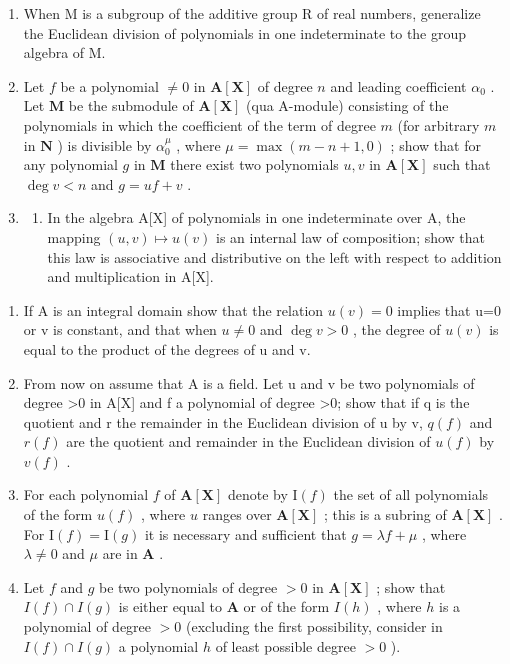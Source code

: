 \BourbakiExerciseGroup

\begin{enumerate}
\def\labelenumi{\arabic{enumi})}
\item
  When M is a subgroup of the additive group R of real numbers, generalize the Euclidean division of polynomials in one indeterminate to the group algebra of M.
\item
  Let \(f\) be a polynomial \(\neq 0\) in \(\mathbf{A}[\mathbf{X}]\) of degree \(n\) and leading coefficient \(\alpha_0\) . Let \(\mathbf{M}\) be the submodule of \(\mathbf{A}[\mathbf{X}]\) (qua A-module) consisting of the polynomials in which the coefficient of the term of degree \(m\) (for arbitrary \(m\) in \(\mathbf{N}\) ) is divisible by \(\alpha_0^\mu\) , where \(\mu = \max(m - n + 1, 0)\) ; show that for any polynomial \(g\) in \(\mathbf{M}\) there exist two polynomials \(u, v\) in \(\mathbf{A}[\mathbf{X}]\) such that \(\deg v < n\) and \(g = uf + v\) .
\item
  \begin{enumerate}
  \def\labelenumii{\alph{enumii})}
  \tightlist
  \item
    In the algebra A{[}X{]} of polynomials in one indeterminate over A, the mapping \((u,v)\mapsto u(v)\) is an internal law of composition; show that this law is associative and distributive on the left with respect to addition and multiplication in A{[}X{]}.
  \end{enumerate}
\end{enumerate}

\begin{enumerate}
\def\labelenumi{\alph{enumi})}
\setcounter{enumi}{1}
\item
  If A is an integral domain show that the relation \(u(v)=0\) implies that u=0 or v is constant, and that when \(u\neq0\) and \(\deg v>0\) , the degree of \(u(v)\) is equal to the product of the degrees of u and v.
\item
  From now on assume that A is a field. Let u and v be two polynomials of degree \textgreater0 in A{[}X{]} and f a polynomial of degree \textgreater0; show that if q is the quotient and r the remainder in the Euclidean division of u by v, \(q(f)\) and \(r(f)\) are the quotient and remainder in the Euclidean division of \(u(f)\) by \(v(f)\) .
\item
  For each polynomial \(f\) of \(\mathbf{A}[\mathbf{X}]\) denote by \(\mathrm{I}(f)\) the set of all polynomials of the form \(u(f)\) , where \(u\) ranges over \(\mathbf{A}[\mathbf{X}]\) ; this is a subring of \(\mathbf{A}[\mathbf{X}]\) . For \(\mathrm{I}(f) = \mathrm{I}(g)\) it is necessary and sufficient that \(g = \lambda f + \mu\) , where \(\lambda \neq 0\) and \(\mu\) are in \(\mathbf{A}\) .
\item
  Let \(f\) and \(g\) be two polynomials of degree \(> 0\) in \(\mathbf{A}[\mathbf{X}]\) ; show that \(I(f) \cap I(g)\) is either equal to \(\mathbf{A}\) or of the form \(I(h)\) , where \(h\) is a polynomial of degree \(> 0\) (excluding the first possibility, consider in \(I(f) \cap I(g)\) a polynomial \(h\) of least possible degree \(> 0\) ).
\end{enumerate}

